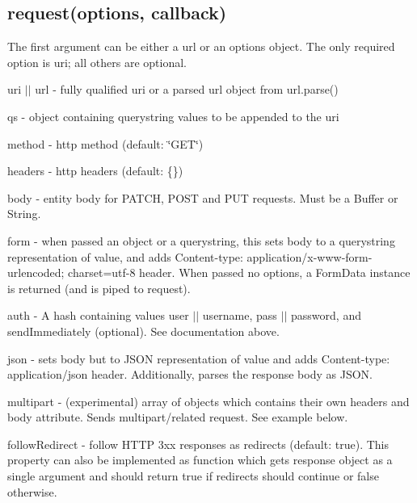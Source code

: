 \subsection*{request(options, callback)}

The first argument can be either a {\ttfamily url} or an {\ttfamily options} object. The only required option is {\ttfamily uri}; all others are optional.


\begin{DoxyItemize}
\item {\ttfamily uri} $\vert$$\vert$ {\ttfamily url} -\/ fully qualified uri or a parsed url object from {\ttfamily url.\+parse()}
\item {\ttfamily qs} -\/ object containing querystring values to be appended to the {\ttfamily uri}
\item {\ttfamily method} -\/ http method (default\+: {\ttfamily \char`\"{}\+G\+E\+T\char`\"{}})
\item {\ttfamily headers} -\/ http headers (default\+: {\ttfamily \{\}})
\item {\ttfamily body} -\/ entity body for P\+A\+T\+C\+H, P\+O\+S\+T and P\+U\+T requests. Must be a {\ttfamily Buffer} or {\ttfamily String}.
\item {\ttfamily form} -\/ when passed an object or a querystring, this sets {\ttfamily body} to a querystring representation of value, and adds {\ttfamily Content-\/type\+: application/x-\/www-\/form-\/urlencoded; charset=utf-\/8} header. When passed no options, a {\ttfamily Form\+Data} instance is returned (and is piped to request).
\item {\ttfamily auth} -\/ A hash containing values {\ttfamily user} $\vert$$\vert$ {\ttfamily username}, {\ttfamily pass} $\vert$$\vert$ {\ttfamily password}, and {\ttfamily send\+Immediately} (optional). See documentation above.
\item {\ttfamily json} -\/ sets {\ttfamily body} but to J\+S\+O\+N representation of value and adds {\ttfamily Content-\/type\+: application/json} header. Additionally, parses the response body as J\+S\+O\+N.
\item {\ttfamily multipart} -\/ (experimental) array of objects which contains their own headers and {\ttfamily body} attribute. Sends {\ttfamily multipart/related} request. See example below.
\item {\ttfamily follow\+Redirect} -\/ follow H\+T\+T\+P 3xx responses as redirects (default\+: {\ttfamily true}). This property can also be implemented as function which gets {\ttfamily response} object as a single argument and should return {\ttfamily true} if redirects should continue or {\ttfamily false} otherwise.
$$
\end{DoxyItemize}
